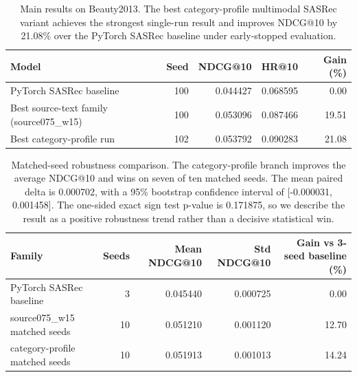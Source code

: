 
\begin{table}[t]
\centering
\small
\begin{tabular}{lrrrr}
\toprule
Model & Seed & NDCG@10 & HR@10 & Gain (\%) \\
\midrule
PyTorch SASRec baseline & 100 & 0.044427 & 0.068595 & 0.00 \\
Best source-text family (source075\_w15) & 100 & 0.053096 & 0.087466 & 19.51 \\
Best category-profile run & 102 & 0.053792 & 0.090283 & 21.08 \\
\bottomrule
\end{tabular}
\caption{Main results on Beauty2013. The best category-profile multimodal SASRec variant achieves the strongest single-run result and improves NDCG@10 by 21.08\% over the PyTorch SASRec baseline under early-stopped evaluation.}
\label{tab:beauty2013_main_results}
\end{table}

\begin{table}[t]
\centering
\small
\begin{tabular}{lrrrr}
\toprule
Family & Seeds & Mean NDCG@10 & Std NDCG@10 & Gain vs 3-seed baseline (\%) \\
\midrule
PyTorch SASRec baseline & 3 & 0.045440 & 0.000725 & 0.00 \\
source075\_w15 matched seeds & 10 & 0.051210 & 0.001120 & 12.70 \\
category-profile matched seeds & 10 & 0.051913 & 0.001013 & 14.24 \\
\bottomrule
\end{tabular}
\caption{Matched-seed robustness comparison. The category-profile branch improves the average NDCG@10 and wins on seven of ten matched seeds. The mean paired delta is 0.000702, with a 95\% bootstrap confidence interval of [-0.000031, 0.001458]. The one-sided exact sign test p-value is 0.171875, so we describe the result as a positive robustness trend rather than a decisive statistical win.}
\label{tab:beauty2013_robustness}
\end{table}

